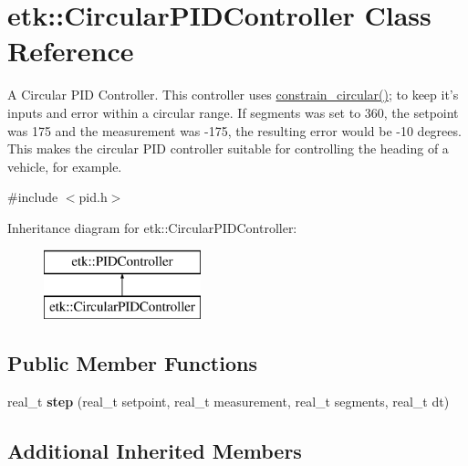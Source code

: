 \hypertarget{classetk_1_1_circular_p_i_d_controller}{\section{etk\-:\-:Circular\-P\-I\-D\-Controller Class Reference}
\label{classetk_1_1_circular_p_i_d_controller}
}


A Circular P\-I\-D Controller. This controller uses \hyperlink{namespaceetk_a77f395cb44512ab4a95d08b01b3c7f20}{constrain\-\_\-circular()}; to keep it's inputs and error within a circular range. If segments was set to 360, the setpoint was 175 and the measurement was -\/175, the resulting error would be -\/10 degrees. This makes the circular P\-I\-D controller suitable for controlling the heading of a vehicle, for example.  




{\ttfamily \#include $<$pid.\-h$>$}

Inheritance diagram for etk\-:\-:Circular\-P\-I\-D\-Controller\-:\begin{figure}[H]
\begin{center}
\leavevmode
\includegraphics[height=2.000000cm]{classetk_1_1_circular_p_i_d_controller}
\end{center}
\end{figure}
\subsection*{Public Member Functions}
\begin{DoxyCompactItemize}
\item 
\hypertarget{classetk_1_1_circular_p_i_d_controller_aa1446e71ef090e15ff1268ec5b98451e}{real\-\_\-t {\bfseries step} (real\-\_\-t setpoint, real\-\_\-t measurement, real\-\_\-t segments, real\-\_\-t dt)}\label{classetk_1_1_circular_p_i_d_controller_aa1446e71ef090e15ff1268ec5b98451e}

\end{DoxyCompactItemize}
\subsection*{Additional Inherited Members}


